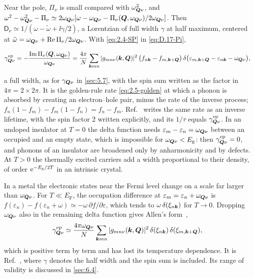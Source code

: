 Near the pole, $\Pi_\nu$ is small compared with $\omega_{\bm{Q}\nu}^2$, and $\omega^2 - \omega_{\bm{Q}\nu}^2 - \Pi_\nu \simeq 2\omega_{\bm{Q}\nu}[\omega - \omega_{\bm{Q}\nu} - \Pi_\nu(\bm{Q},\omega_{\bm{Q}\nu})/2\omega_{\bm{Q}\nu}]$. Then $\mathsf{D}_\nu \simeq 1/(\omega - \tilde\omega + \ii\gamma/2)$, a Lorentzian of full width $\gamma$ at half maximum, centered at $\tilde\omega = \omega_{\bm{Q}\nu} + \operatorname{Re}\Pi_\nu/2\omega_{\bm{Q}\nu}$. With \cref{eq:2.4-SP} in \cref{eq:D.17-Pi},
\begin{keyresult}
\begin{equation}
  \gamma^{\mathrm{ep}}_{\bm{Q}\nu} = -\frac{\operatorname{Im}\Pi_\nu(\bm{Q},\omega_{\bm{Q}\nu})}{\omega_{\bm{Q}\nu}}
  = \frac{4\pi}{N}\sum_{\bm{k}mn}|g_{mn\nu}(\bm{k},\bm{Q})|^2\,\bigl(f_{n\bm{k}} - f_{m,\bm{k}+\bm{Q}}\bigr)\,\delta\bigl(\varepsilon_{m,\bm{k}+\bm{Q}} - \varepsilon_{n\bm{k}} - \omega_{\bm{Q}\nu}\bigr) ,
  \label{eq:D.17-gamma}
\end{equation}
\end{keyresult}
a full width, as for $\gamma_{\bm{Q}\nu}$ in \cref{sec:5.7}, with the spin sum written as the factor in $4\pi = 2\times2\pi$. It is the golden-rule rate \cref{eq:2.5-golden} at which a phonon is absorbed by creating an electron--hole pair, minus the rate of the inverse process; $f_n(1 - f_m) - f_m(1 - f_n) = f_n - f_m$. Ref.~\cite[Eq.~(146)]{giustino2017electron} writes the same rate as an inverse lifetime, with the spin factor 2 written explicitly, and its $1/\tau$ equals $\gamma^{\mathrm{ep}}_{\bm{Q}\nu}$. In an undoped insulator at $T = 0$ the delta function needs $\varepsilon_m - \varepsilon_n = \omega_{\bm{Q}\nu}$ between an occupied and an empty state, which is impossible for $\omega_{\bm{Q}\nu} < E_{\mathrm{g}}$: then $\gamma^{\mathrm{ep}}_{\bm{Q}\nu} = 0$, and phonons of an insulator are broadened only by anharmonicity and by defects. At $T > 0$ the thermally excited carriers add a width proportional to their density, of order $\mathrm{e}^{-E_{\mathrm{g}}/2T}$ in an intrinsic crystal.

In a metal the electronic states near the Fermi level change on a scale far larger than $\omega_{\bm{Q}\nu}$. For $T \ll E_{\mathrm{F}}$, the occupation difference at $\varepsilon_m = \varepsilon_n + \omega_{\bm{Q}\nu}$ is $f(\varepsilon_n) - f(\varepsilon_n + \omega) \simeq -\omega\,\partial f/\partial\varepsilon$, which tends to $\omega\,\delta(\xi_{n\bm{k}})$ for $T \to 0$. Dropping $\omega_{\bm{Q}\nu}$ also in the remaining delta function gives Allen's form~\cite{allen1972neutron},
\begin{equation}
  \gamma^{\mathrm{ep}}_{\bm{Q}\nu} \simeq \frac{4\pi\omega_{\bm{Q}\nu}}{N}\sum_{\bm{k}mn}|g_{mn\nu}(\bm{k},\bm{Q})|^2\,\delta(\xi_{n\bm{k}})\,\delta(\xi_{m,\bm{k}+\bm{Q}}) ,
  \label{eq:D.17-allen}
\end{equation}
which is positive term by term and has lost its temperature dependence. It is Ref.~\cite[Eq.~(185)]{giustino2017electron}, where $\gamma$ denotes the half width and the spin sum is included. Its range of validity is discussed in \cref{sec:6.4}.

